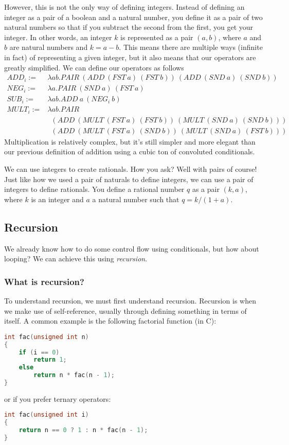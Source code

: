 \documentclass[11pt]{article}
\begin{document}
However, this is not the only way of defining integers. Instead of defining an
integer as a pair of a boolean and a natural number, you define it as a pair of
two natural numbers so that if you subtract the second from the first, you get
your integer. In other words, an integer \(k\) is represented as a pair
\((a,b)\), where \(a\) and \(b\) are natural numbers and \(k=a-b\). This means
there are multiple ways (infinite in fact) of representing a given integer, but
it also means that our operators are greatly simplified. We can define our
operators as follows
\begin{align*}
	ADD_i:=&\lambda ab.PAIR\ (ADD\ (FST\ a)\ (FST\ b))\ (ADD\ (SND\ a)\ (SND\ b))\\
	NEG_i:=&\lambda a.PAIR\ (SND\ a)\ (FST\ a)\\
	SUB_i:=&\lambda ab.ADD\ a\ (NEG_i\ b)\\
	MULT_i:=&\lambda ab.PAIR\\
		&\enspace(ADD\ (MULT\ (FST\ a)\ (FST\ b))\ (MULT\ (SND\ a)\ (SND\ b)))\\
		&\enspace(ADD\ (MULT\ (FST\ a)\ (SND\ b))\ (MULT\ (SND\ a)\ (FST\ b)))
\end{align*}
Multiplication is relatively complex, but it's still simpler and more elegant
than our previous definition of addition using a cubic ton of convoluted
conditionals.

We can use integers to create rationals. How you ask? Well with pairs of
course! Just like how we used a pair of naturals to define integers, we can use
a pair of integers to define rationals. You define a rational number \(q\) as a
pair \((k,a)\), where \(k\) is an integer and \(a\) a natural number such that
\(q=k/(1+a)\).


\subsection{Recursion}\label{recursion}


We already know how to do some control flow using conditionals, but how about
looping? We can achieve this using \emph{recursion}.

\subsubsection{What is recursion?}

To understand recursion, we must first understand recursion. Recursion is when
we make use of self-reference, usually through defining something in terms of
itself. A common example is the following factorial function (in C):
\begin{lstlisting}[language=C]
int fac(unsigned int n)
{
	if (i == 0)
		return 1;
	else
		return n * fac(n - 1);
}
\end{lstlisting}
or if you prefer ternary operators:
\begin{lstlisting}[language=C]
int fac(unsigned int i)
{
	return n == 0 ? 1 : n * fac(n - 1);
}
\end{lstlisting}
\end{document}
